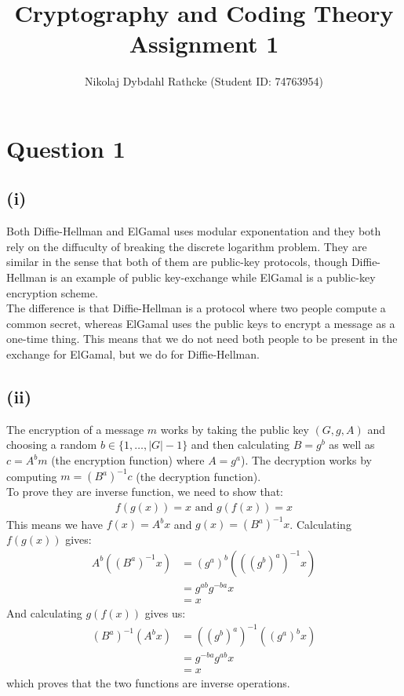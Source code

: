 \documentclass[a4paper, fleqn]{article}
\author{Nikolaj Dybdahl Rathcke (Student ID: 74763954)}
\title{Cryptography and Coding Theory \\ Assignment 1}
\begin{document}


\section{Question 1}
\subsection{(i)}
Both Diffie-Hellman and ElGamal uses modular exponentation and they both rely on the diffuculty of breaking the discrete logarithm problem. They are similar in the sense that both of them are public-key protocols, though Diffie-Hellman is an example of public key-exchange while ElGamal is a public-key encryption scheme. \\
The difference is that Diffie-Hellman is a protocol where two people compute a common secret, whereas ElGamal uses the public keys to encrypt a message as a one-time thing. This means that we do not need both people to be present in the exchange for ElGamal, but we do for Diffie-Hellman.

\subsection{(ii)}
The encryption of a message $m$ works by taking the public key $(G, g, A)$ and choosing a random $b\in \{1,\ldots, |G|-1\}$ and then calculating $B=g^b$ as well as $c=A^bm$ (the encryption function) where $A=g^a$). The decryption works by computing $m=(B^a)^{-1}c$ (the decryption function). \\
To prove they are inverse function, we need to show that:
\begin{align*}
  f(g(x))=x \mbox{ and } g(f(x))=x
\end{align*}
This means we have $f(x)=A^bx$ and $g(x)=(B^a)^{-1}x$. Calculating $f(g(x))$ gives:
\begin{align*}
  A^b((B^a)^{-1}x) &= (g^a)^b(((g^b)^a)^{-1}x) \\
                   &= g^{ab}g^{-ba}x \\
                   &= x
\end{align*}
And calculating $g(f(x))$ gives us:
\begin{align*}
  (B^a)^{-1}(A^bx) &= ((g^b)^a)^{-1}((g^a)^bx) \\
                   &= g^{-ba}g^{ab}x \\
                   &= x
\end{align*}
which proves that the two functions are inverse operations.
\end{document}
